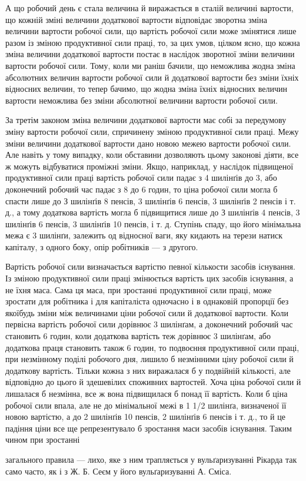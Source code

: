 А що робочий день є стала величина й виражається в сталій
величині вартости, що кожній зміні величини додаткової вартости
відповідає зворотна зміна величини вартости робочої сили, що
вартість робочої сили може змінятися лише разом із зміною продуктивної
сили праці, то, за цих умов, цілком ясно, що кожна
зміна величини додаткової вартости постає в наслідок зворотної
зміни величини вартости робочої сили. Тому, коли ми раніш
бачили, що неможлива жодна зміна абсолютних величин вартости
робочої сили й додаткової вартости без зміни їхніх відносних
величин, то тепер бачимо, що жодна зміна їхніх відносних
величин вартости неможлива без зміни абсолютної величини вартости
робочої сили.

За третім законом зміна величини додаткової вартости має
собі за передумову зміну вартости робочої сили, спричинену
зміною продуктивної сили праці. Межу зміни величини додаткової
вартости дано новою межею вартости робочої сили. Але навіть
у тому випадку, коли обставини дозволяють цьому законові
діяти, все ж можуть відбуватися проміжні зміни. Якщо, наприклад,
у наслідок підвищеної продуктивної сили праці вартість
робочої сили падає з 4 шилінґів до 3, або доконечний робочий час
падає з 8 до 6 годин, то ціна робочої сили могла б спасти лише до
З шилінґів 8 пенсів, 3 шилінґів 6 пенсів, 3 шилінґів 2 пенсів
і т. д., а тому додаткова вартість могла б підвищитися лише до
З шилінґів 4 пенсів, 3 шилінґів 6 пенсів, 3 шилінґів 10 пенсів,
і т. д. Ступінь спаду, що його мінімальна межа є 3 шилінґи,
залежить од відносної ваги, яку кидають на терези натиск капіталу,
з одного боку, опір робітників — з другого.

Вартість робочої сили визначається вартістю певної кількости
засобів існування. Із зміною продуктивної сили праці змінюється
вартість цих засобів існування, а не їхня маса. Сама ця
маса, при зростанні продуктивної сили праці, може зростати для
робітника і для капіталіста одночасно і в однаковій пропорції
без якоїбудь зміни між величинами ціни робочої сили й додаткової
вартости. Коли первісна вартість робочої сили дорівнює 3 шилінґам,
а доконечний робочий час становить 6 годин, коли додаткова
вартість теж дорівнює 3 шилінґам, або додаткова праця
становить також 6 годин, то подвоєння продуктивної сили праці,
при незмінному поділі робочого дня, лишило б незмінними ціну
робочої сили й додаткову вартість. Тільки кожна з них виражалася
б у подвійній кількості, але відповідно до цього й здешевілих
споживних вартостей. Хоча ціна робочої сили й лишалася б
незмінна, все ж вона підвищилася б понад її вартість. Коли б
ціна робочої сили впала, але не до мінімальної межі в 1 1/2 шилінґа,
визначеної її новою вартістю, а до 2 шилінґів 10 пенсів, 2 шилінґів
6 пенсів і т. д., то й це падіння ціни все ще репрезентувало б
зростання маси засобів існування. Таким чином при зростанні

загального правила — лихо, яке з ним трапляється у вульґаризуванні
Рікарда так само часто, як і з Ж. Б. Сеєм у його вульґаризуванні А. Сміса.
\parbreak{}  %
